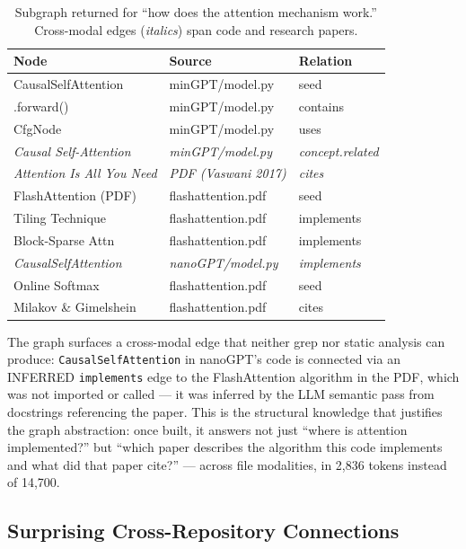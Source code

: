 \begin{table}[h]
\centering
\caption{Subgraph returned for ``how does the attention mechanism work.''
         Cross-modal edges (\textit{italics}) span code and research papers.}
\label{tab:casestudy}
\begin{tabular}{lll}
\toprule
\textbf{Node} & \textbf{Source} & \textbf{Relation} \\
\midrule
CausalSelfAttention      & minGPT/model.py      & seed     \\
\quad .forward()         & minGPT/model.py      & contains \\
\quad CfgNode            & minGPT/model.py      & uses     \\
\quad \textit{Causal Self-Attention}   & \textit{minGPT/model.py}
                         & \textit{concept.related} \\
\quad\quad \textit{Attention Is All You Need}  & \textit{PDF (Vaswani 2017)}
                         & \textit{cites} \\
FlashAttention (PDF)     & flashattention.pdf   & seed     \\
\quad Tiling Technique   & flashattention.pdf   & implements \\
\quad Block-Sparse Attn  & flashattention.pdf   & implements \\
\quad \textit{CausalSelfAttention}     & \textit{nanoGPT/model.py}
                         & \textit{implements} \\
Online Softmax           & flashattention.pdf   & seed     \\
\quad Milakov \& Gimelshein & flashattention.pdf & cites    \\
\bottomrule
\end{tabular}
\end{table}

The graph surfaces a cross-modal edge that neither grep nor static analysis
can produce: \texttt{CausalSelfAttention} in nanoGPT's code is connected via
an INFERRED \texttt{implements} edge to the FlashAttention algorithm in the PDF,
which was not imported or called --- it was inferred by the LLM semantic pass
from docstrings referencing the paper. This is the structural knowledge that
justifies the graph abstraction: once built, it answers not just ``where is
attention implemented?'' but ``which paper describes the algorithm this code
implements and what did that paper cite?'' --- across file modalities, in 2,836
tokens instead of 14,700.

\subsection{Surprising Cross-Repository Connections}

